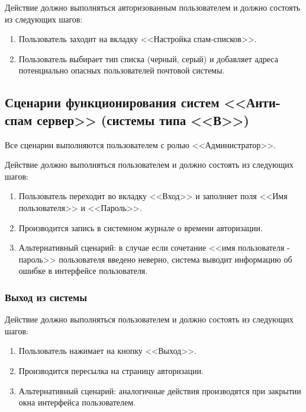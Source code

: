 Действие должно выполняться авторизованным пользователем и должно состоять из следующих шагов:
\begin{enumerate}
  \item Пользователь заходит на вкладку <<Настройка спам-списков>>.
  \item Пользователь выбирает тип списка (черный, серый) и добавляет адреса потенциально опасных пользователей почтовой системы.
\end{enumerate}

\subsection{Сценарии функционирования систем <<Анти-спам сервер>> (системы типа <<В>>)}
Все сценарии выполняются пользователем с ролью <<Администратор>>.

Действие должно выполняться пользователем и должно состоять из следующих шагов:
\begin{enumerate}
  \item Пользователь переходит во вкладку <<Вход>> и заполняет поля <<Имя пользователя>> и <<Пароль>>.
  \item Производится запись в системном журнале о времени авторизации.
  \item Альтернативный сценарий: в случае если сочетание <<имя пользователя - пароль>> пользователя введено неверно, система выводит информацию об ошибке в интерфейсе пользователя.
\end{enumerate}

\subsubsection{Выход из системы}
Действие должно выполняться пользователем и должно состоять из следующих шагов:
\begin{enumerate}
  \item Пользователь нажимает на кнопку <<Выход>>.
  \item Производится пересылка на страницу авторизации.
  \item Альтернативный сценарий: аналогичные действия производятся при закрытии окна интерфейса пользователем.
\end{enumerate}

